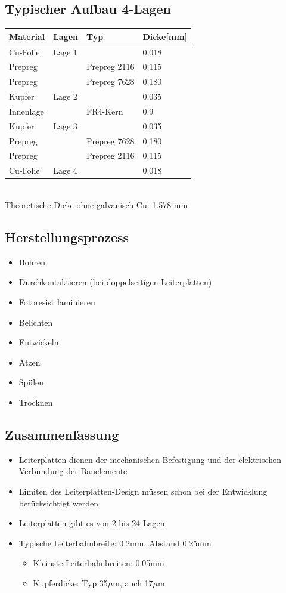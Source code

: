 \subsection{Typischer Aufbau 4-Lagen}
\begin{tabular}{|l|l|l|l|}
\hline
Material&Lagen&Typ&Dicke[mm]\\
\hline
Cu-Folie&Lage 1&&0.018\\
\hline
Prepreg&&Prepreg 2116&0.115\\
\hline
Prepreg&&Prepreg 7628&0.180\\
\hline
Kupfer&Lage 2&&0.035\\
\hline
Innenlage&&FR4-Kern&0.9\\
\hline
Kupfer&Lage 3&&0.035\\
\hline
Prepreg&&Prepreg 7628&0.180\\
\hline
Prepreg&&Prepreg 2116&0.115\\
\hline
Cu-Folie&Lage 4&&0.018\\
\hline
\end{tabular}
\\
Theoretische Dicke ohne galvanisch Cu: 1.578 mm

\subsection{Herstellungsprozess}
\begin{itemize}
  \item Bohren
  \item Durchkontaktieren (bei doppelseitigen Leiterplatten)
  \item Fotoresist laminieren
  \item Belichten
  \item Entwickeln
  \item Ätzen
  \item Spülen 
  \item Trocknen
\end{itemize}

\subsection{Zusammenfassung}
\begin{itemize}
  \item Leiterplatten dienen der mechanischen Befestigung und der elektrischen
  Verbundung der Bauelemente
  \item Limiten des Leiterplatten-Design müssen schon bei der Entwicklung
  berücksichtigt werden
  \item Leiterplatten gibt es von 2 bis 24 Lagen
  \item Typische Leiterbahnbreite: 0.2mm, Abstand 0.25mm
  \begin{itemize}
    \item Kleinste Leiterbahnbreiten: 0.05mm
    \item Kupferdicke: Typ 35$\mu$m, auch 17$\mu$m
   \end{itemize}
\end{itemize}
